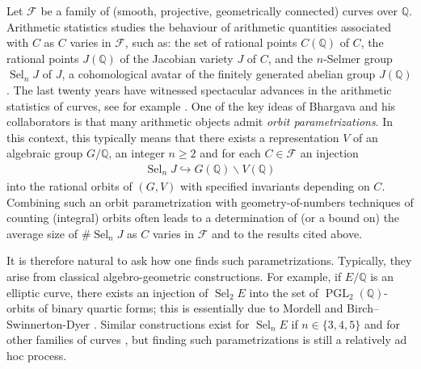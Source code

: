 \documentclass{article} %
\numberwithin{equation}{section}
\theoremstyle{definition}
\DeclareMathOperator{\PGL}{PGL}
\newcommand{\Q}{\mathbb{Q}}
\DeclareMathOperator{\Sel}{Sel}
\begin{document}
Let $\mathcal{F}$ be a family of (smooth, projective, geometrically connected) curves over $\Q$.
Arithmetic statistics studies the behaviour of arithmetic quantities associated with $C$ as $C$ varies in $\mathcal{F}$, such as: the set of rational points $C(\Q)$ of $C$, the rational points $J(\Q)$ of the Jacobian variety $J$ of $C$, and the $n$-Selmer group $\Sel_n J$ of $J$, a cohomological avatar of the finitely generated abelian group $J(\Q)$.
The last twenty years have witnessed spectacular advances in the arithmetic statistics of curves, see for example \cite{BS-2selmerellcurves,BS-3Selmer, BS-4Selmer, BS-5Selmer, Bhargava-Gross-hyperellcurves, BhargavaGrossWang-positiveproportionnopoints, PoonenStoll-Mosthyperellipticnorational}.
One of the key ideas of Bhargava and his collaborators is that many arithmetic objects admit \emph{orbit parametrizations}.
In this context, this typically means that there exists a representation $V$ of an algebraic group $G/\Q$, an integer $n\geq 2$ and for each $C\in \mathcal{F}$ an injection 
\begin{align}\label{equation intro: embedding n-selmer}
    \Sel_n J \hookrightarrow G(\Q) \backslash V(\Q)
\end{align}
into the rational orbits of $(G,V)$ with specified invariants depending on $C$.
Combining such an orbit parametrization with geometry-of-numbers techniques of counting (integral) orbits often leads to a determination of (or a bound on) the average size of $\#\Sel_nJ$ as $C$ varies in $\mathcal{F}$ and to the results cited above.


It is therefore natural to ask how one finds such parametrizations.
Typically, they arise from classical algebro-geometric constructions.
For example, if $E/\Q$ is an elliptic curve, there exists an injection of $\Sel_2 E$ into the set of $\PGL_2(\Q)$-orbits of binary quartic forms; this is essentially due to Mordell and Birch--Swinnerton-Dyer \cite{BirchSwinnertonDyer-notesonellcurves1}.
Similar constructions exist for $\Sel_n E$ if $n\in \{3,4,5\}$ and for other families of curves \cite{BhargavaHo-coregularspacesgenusone}, but finding such parametrizations is still a relatively ad hoc process.
\end{document}
